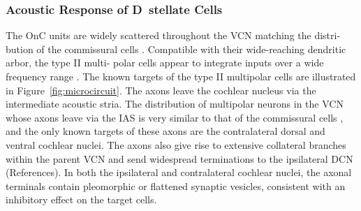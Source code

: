 

\subsubsection{Acoustic Response of D~stellate  Cells}



The OnC units are widely scattered throughout the VCN %
matching the distri- bution of the commissural cells
\citep{PaoliniClareyEtAl:2005,NeedhamPaolini:2007}. %
Compatible with their wide-reaching dendritic arbor, the type II multi- polar
cells appear to integrate inputs over a wide frequency range
\citep{PalmerWallaceEtAl:2003}.  The known targets of the type II multipolar
cells are illustrated in Figure~\ref{fig:microcircuit}. The axons leave the
cochlear nucleus via the intermediate acoustic stria. %
The distribution of multipolar neurons in the VCN whose axons leave via the IAS
is very similar to that of the commissural cells %
, and the only known targets of these axons are the contralateral dorsal and
ventral cochlear nuclei.%
The axons also give rise to extensive collateral branches within the parent VCN
and send widespread terminations to the ipsilateral DCN
(References). %
In both the ipsilateral and contralateral cochlear nuclei, the axonal terminals
contain pleomorphic or flattened synaptic vesicles, consistent with an
inhibitory effect on the target cells. %

